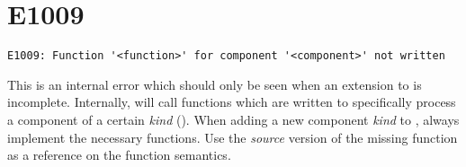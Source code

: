\section{E1009}

\begin{footnotesize}
\begin{verbatim}
E1009: Function '<function>' for component '<component>' not written
\end{verbatim}
\end{footnotesize}

This is an internal error which should only be seen when an extension
to \lmsbw is incomplete.  Internally, \lmsbw will call functions which
are written to specifically process a component of a certain
\emph{kind} ().  When adding a new component
\emph{kind} to \lmsbw, always implement the necessary functions.  Use
the \emph{source} version of the missing function as a reference on
the function semantics.

